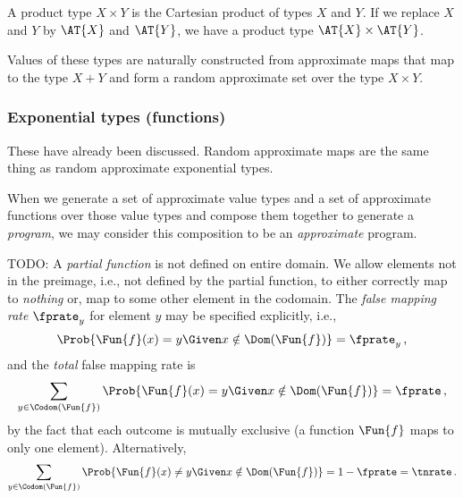 \documentclass[ ../main.tex]{subfiles}
\begin{document}
A product type $X \times Y$ is the Cartesian product of types $X$ and $Y$.
If we replace $X$ and $Y$ by $\AT{X}$ and $\AT{Y}$, we have a product type $\AT{X} \times \AT{Y}$.

Values of these types are naturally constructed from approximate maps that map to the type $X+Y$ and form a random approximate set over the type $X \times Y$.

\subsubsection{Exponential types (functions)}

These have already been discussed.
Random approximate maps are the same thing as random approximate exponential types.
	

When we generate a set of approximate value types and a set of approximate functions over those value types and compose them together to generate a \emph{program}, we may consider this composition to be an \emph{approximate} program.

TODO:
A \emph{partial function} is not defined on entire domain.
We allow elements not in the preimage, i.e., not defined by the partial function, to either correctly map to \emph{nothing} or, map to some other element in the codomain.
The \emph{false mapping rate} $\fprate_{y}$ for element $y$ may be specified explicitly, i.e.,
\begin{equation}
\Prob{\Fun{f}(x) = y \Given x \notin \Dom(\Fun{f})} = \fprate_{y}\,,
\end{equation}
and the \emph{total} false mapping rate is
\begin{equation}
\sum_{y \in \Codom(\Fun{f})} \Prob{\Fun{f}(x) = y \Given x \notin \Dom(\Fun{f})} = \fprate\,,
\end{equation}
by the fact that each outcome is mutually exclusive (a function $\Fun{f}$ maps to only one element).
Alternatively,
\begin{equation}
\sum_{y \in \Codom(\Fun{f})} \Prob{\Fun{f}(x) \neq y \Given x \notin \Dom(\Fun{f})} = 1-\fprate = \tnrate\,.
\end{equation}
\end{document}
